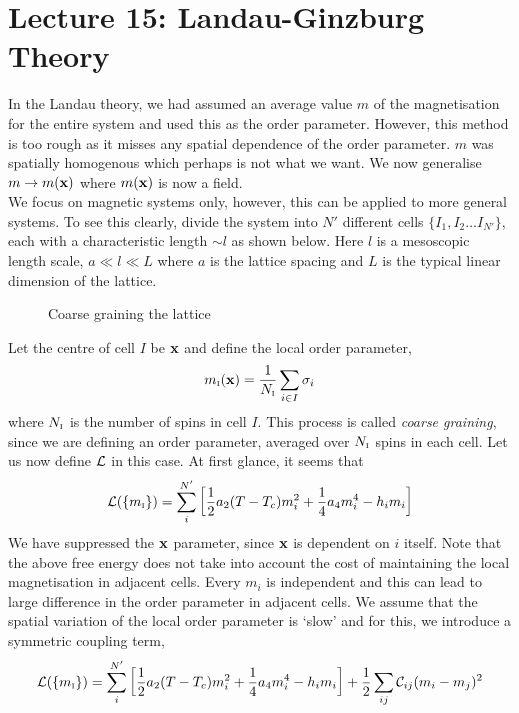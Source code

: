 \section*{Lecture 15: Landau-Ginzburg Theory}
In the Landau theory, we had assumed an average value $m$ of the magnetisation for the entire system and used this as the order parameter. However, this method is too rough as it misses any spatial dependence of the order parameter. $m$ was spatially homogenous which perhaps is not what we want. We now generalise $m \to m(\vb{x})$ where $m(\vb{x})$ is now a field.\\[0.2cm]
We focus on magnetic systems only, however, this can be applied to more general systems. To see this clearly, divide the system into $N'$ different cells $\{I_1, I_2\ldots I_{N'} \}$, each with a characteristic length $\sim l$ as shown below. Here $l$ is a mesoscopic length scale, $a\ll l \ll L$ where $a$ is the lattice spacing and $L$ is the typical linear dimension of the lattice.
\begin{figure}[H]
    \centering 
    
    \caption{Coarse graining the lattice}
\end{figure}
\noindent
Let the centre  of cell $I$ be $\vb{x}$ and define the local order parameter,
\begin{equation}
    m_{\text{\tiny I}}(\vb{x}) = \frac{1}{N_{\text{\tiny I}}}\sum\limits_{i\in I} \sigma_i
\end{equation}
where $N_{\text{\tiny I}}$ is the number of spins in cell $I$. This process is called \textit{coarse graining}, since we are defining an order parameter, averaged over $N_{\text{\tiny I}}$ spins in each cell. Let us now define $\mathcal L$ in this case. At first glance, it seems that 
\begin{equation*}
    \mathcal L(\{m_{\text{\tiny I}}\}) = \sum\limits_{i}^{N'}\qty[ \frac{1}{2}a_2(T-T_c)m_i^2 + \frac{1}{4}a_4 m_i^4 - h_im_i]
\end{equation*}
We have suppressed the $\vb{x}$ parameter, since $\vb{x}$ is dependent on $i$ itself. Note that the above free energy does not take into account the cost of maintaining the local magnetisation in adjacent cells. Every $m_i$ is independent and this can lead to large difference in the order parameter in adjacent cells. We assume that the spatial variation of the local order parameter is `slow' and for this, we introduce a symmetric coupling term, 
\begin{equation}
    \mathcal L(\{m_{\text{\tiny I}}\}) = \sum\limits_{i}^{N'}\qty[ \frac{1}{2}a_2(T-T_c)m_i^2 + \frac{1}{4}a_4 m_i^4 - h_im_i] +\frac{1}{2}\sum\limits_{ij}\mathcal C_{ij} (m_i - m_j)^2
\end{equation}
